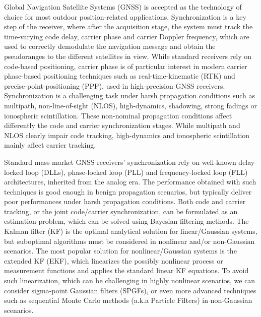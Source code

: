 Global Navigation Satellite Systems (GNSS) is accepted as the technology of choice for most outdoor position-related applications. Synchronization is a key step of the receiver, where after the acquisition stage, the system must track the time-varying code delay, carrier phase and carrier Doppler frequency, which are used to correctly demodulate the navigation message and obtain the pseudoranges to the different satellites in view. While standard receivers rely on code-based positioning, carrier phase is of particular interest in modern carrier phase-based positioning techniques such as real-time-kinematic (RTK) and precise-point-positioning (PPP), used in high-precision GNSS receivers. Synchronization is a challenging task under harsh propagation conditions such as multipath, non-line-of-sight (NLOS), high-dynamics, shadowing, strong fadings or ionospheric scintillation. These non-nominal propagation conditions affect differently the code and carrier synchronization stages. While multipath and NLOS clearly impair code tracking, high-dynamics and ionospheric scintillation mainly affect carrier tracking. %

Standard mass-market GNSS receivers' synchronization rely on well-known delay-locked loop (DLLs), phase-locked loop (PLL) and frequency-locked loop (FLL) architectures, inherited from the analog era. The performance obtained with such techniques is good enough in benign propagation scenarios, but typically deliver poor performances under harsh propagation conditions. Both code and carrier tracking, or the joint code/carrier synchronization, can be formulated as an estimation problem, which can be solved using Bayesian filtering methods. The Kalman filter (KF) is the optimal analytical solution for linear/Gaussian systems, but suboptimal algorithms must be considered in nonlinear and/or non-Gaussian scenarios. The most popular solution for nonlinear/Gaussian systems is the extended KF (EKF), which linearizes the possibly nonlinear process or measurement functions and applies the standard linear KF equations. To avoid such linearization, which can be challenging in highly nonlinear scenarios, we can consider sigma-point Gaussian filters (SPGFs), or even more advanced techniques such as sequential Monte Carlo methods (a.k.a Particle Filters) in non-Gaussian scenarios. 


